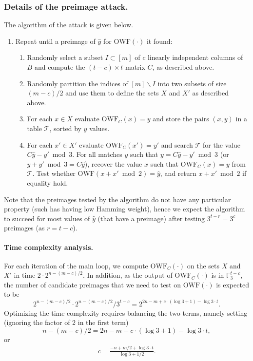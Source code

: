 \documentclass[orivec,envcountsect]{llncs}
\newcommand{\OWF}{\text{OWF}}
\begin{document}
\subsubsection{Details of the preimage attack.}
The algorithm of the attack is given below.
\begin{enumerate}
\item Repeat until a preimage of $\hat{y}$ for $\OWF(\cdot)$ it found:
    \begin{enumerate}
    \item Randomly select a subset $I \subset [m]$ of $c$ linearly independent columns of $B$ and compute the $(t-c) \times t$ matrix $C$, as described above.
    \item Randomly partition the indices of $[m] \backslash I$ into two subsets of size $(m -c)/2$ and use them to define the sets $X$ and $X'$ as described above.
  \item For each $x \in X$ evaluate $\OWF_C(x) = y$ and store the pairs $(x,y)$ in a table $\mathcal{T}$, sorted by $y$ values.
  \item For each $x' \in X'$ evaluate $\OWF_C(x') = y'$ and search $\mathcal{T}$ for the value $C \hat{y} - y' \bmod 3$. For all matches $y$ such that $y = C \hat{y} - y' \bmod 3$ (or $y + y' \bmod 3 = C\hat{y}$), recover the value $x$ such that $\OWF_C(x) = y$ from $\mathcal{T}$. Test whether $\OWF(x + x' \bmod 2) = \hat{y}$, and return $x + x' \bmod 2$ if equality hold.
    \end{enumerate}
\end{enumerate}
Note that the preimages tested by the algorithm do not have any particular property (such has having low Hamming weight), hence we expect the algorithm to succeed for most values of $\hat{y}$ (that have a preimage) after testing $3^{t - r} = 3^c$ preimages (as $r = t-c$).

\paragraph{Time complexity analysis.}
For each iteration of the main loop, we compute $\OWF_C(\cdot)$ on the sets $X$ and $X'$ in time $2 \cdot 2^{n - (m -c)/2}$. In addition, as the output of $\OWF_C(\cdot)$ is in $\mathbb{F}_3^{t-c}$,
the number of candidate preimages that we need to test on $\OWF(\cdot)$ is expected to be
$$2^{n - (m -c)/2} \cdot 2^{n - (m -c)/2} / 3^{t-c} = 2^{2n - m + c \cdot (\log 3 + 1) - \log 3 \cdot t}.$$
Optimizing the time complexity requires balancing the two terms, namely setting (ignoring the factor of 2 in the first term)
$$n - (m -c)/2 = 2n - m + c \cdot (\log 3 + 1) - \log 3 \cdot t,$$ or
\begin{align}
\label{eq:c}
c = \tfrac{-n + m/2 + \log 3 \cdot t}{\log 3 + 1/2}.
\end{align}
\end{document}
